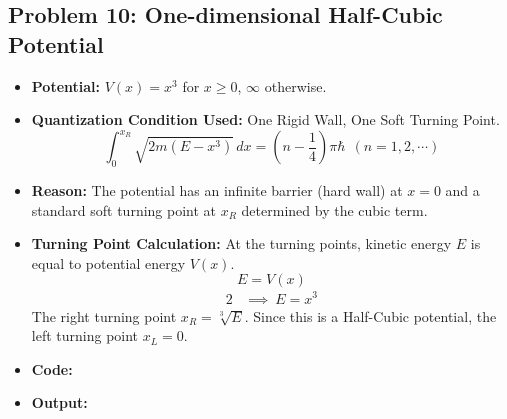 \documentclass[12pt, a4paper, twoside]{article}
\begin{document}
        \subsection{Problem 10: One-dimensional Half-Cubic Potential}
        \begin{itemize}
            \item {\bf Potential: } $V(x) = x^3$ for $x \geq 0$, $\infty$ otherwise.
            \item {\bf Quantization Condition Used: } One Rigid Wall, One Soft Turning Point. $${\int_{0}^{x_R} \sqrt{2m(E - x^3)} \, dx} = {\left(n - \frac{1}{4}\right) \pi \hbar} ~~ (n = 1, 2, \cdots)$$
            \item {\bf Reason: }  The potential has an infinite barrier (hard wall) at $x=0$ and a standard soft turning point at $x_R$ determined by the cubic term.
            \item {\bf Turning Point Calculation: } At the turning points, kinetic energy $E$ is equal to potential energy $V(x)$. $$E = V(x)$$ \begin{alignat*}{2}
                &\implies ~ E = x^3
            \end{alignat*}
            The right turning point $ \boxed{x_R = \sqrt[3]{E}}$. Since this is a Half-Cubic potential, the left turning point $\boxed{x_L = 0}$.
            \item {\bf Code: } 
            \item {\bf Output: } 
        \end{itemize}
\end{document}
